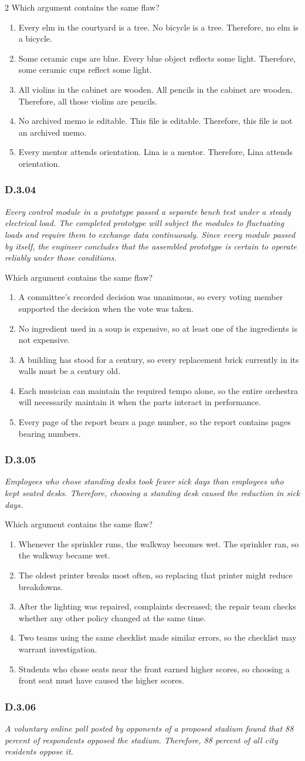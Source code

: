\documentclass[10pt]{extarticle}
\newcommand{\choice}[1]{\item #1}
\newcommand{\bankitem}[1]{\subsubsection*{#1}}
\begin{document}
\begin{multicols}{2}
Which argument contains the same flaw?
\begin{enumerate}[label=(\alph*)]
  \choice{Every elm in the courtyard is a tree. No bicycle is a tree. Therefore, no elm is a bicycle.}
  \choice{Some ceramic cups are blue. Every blue object reflects some light. Therefore, some ceramic cups reflect some light.}
  \choice{All violins in the cabinet are wooden. All pencils in the cabinet are wooden. Therefore, all those violins are pencils.}
  \choice{No archived memo is editable. This file is editable. Therefore, this file is not an archived memo.}
  \choice{Every mentor attends orientation. Lina is a mentor. Therefore, Lina attends orientation.}
\end{enumerate}
\bankitem{D.3.04}
\emph{Every control module in a prototype passed a separate bench test under a steady electrical load. The completed prototype will subject the modules to fluctuating loads and require them to exchange data continuously. Since every module passed by itself, the engineer concludes that the assembled prototype is certain to operate reliably under those conditions.}

Which argument contains the same flaw?
\begin{enumerate}[label=(\alph*)]
  \choice{A committee's recorded decision was unanimous, so every voting member supported the decision when the vote was taken.}
  \choice{No ingredient used in a soup is expensive, so at least one of the ingredients is not expensive.}
  \choice{A building has stood for a century, so every replacement brick currently in its walls must be a century old.}
  \choice{Each musician can maintain the required tempo alone, so the entire orchestra will necessarily maintain it when the parts interact in performance.}
  \choice{Every page of the report bears a page number, so the report contains pages bearing numbers.}
\end{enumerate}
\bankitem{D.3.05}
\emph{Employees who chose standing desks took fewer sick days than employees who kept seated desks. Therefore, choosing a standing desk caused the reduction in sick days.}

Which argument contains the same flaw?
\begin{enumerate}[label=(\alph*)]
  \choice{Whenever the sprinkler runs, the walkway becomes wet. The sprinkler ran, so the walkway became wet.}
  \choice{The oldest printer breaks most often, so replacing that printer might reduce breakdowns.}
  \choice{After the lighting was repaired, complaints decreased; the repair team checks whether any other policy changed at the same time.}
  \choice{Two teams using the same checklist made similar errors, so the checklist may warrant investigation.}
  \choice{Students who chose seats near the front earned higher scores, so choosing a front seat must have caused the higher scores.}
\end{enumerate}
\bankitem{D.3.06}
\emph{A voluntary online poll posted by opponents of a proposed stadium found that 88 percent of respondents opposed the stadium. Therefore, 88 percent of all city residents oppose it.}


\end{multicols}
\end{document}
